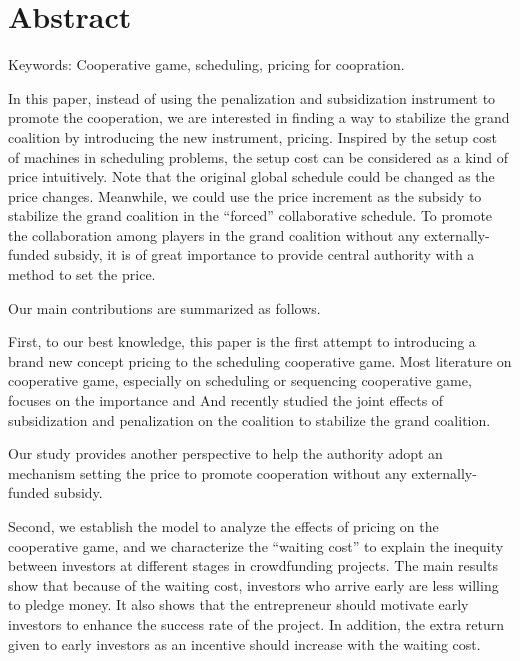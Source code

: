 \section*{Abstract}



Keywords: Cooperative game, scheduling, pricing for coopration.


In this paper, instead of using the penalization and subsidization instrument to promote the cooperation, we are interested in finding a way to stabilize the grand coalition by introducing the new instrument, pricing. Inspired by the setup cost of machines in scheduling problems, the setup cost can be considered as a kind of price intuitively. Note that the original global schedule could be changed as the price changes. Meanwhile, we could use the price increment as the subsidy to stabilize the grand coalition in the “forced” collaborative schedule.
To promote the collaboration among players in the grand coalition without any externally-funded subsidy, it is of great importance to provide central authority with a method to set the price.

Our main contributions are summarized as follows.

First, to our best knowledge, this paper is the first attempt to introducing a brand new concept pricing to the scheduling cooperative game. Most literature on cooperative game, especially on scheduling or sequencing cooperative game, focuses on the importance
and
And recently studied the joint effects of subsidization and penalization on the coalition to stabilize the grand coalition.

Our study provides another perspective to help the authority adopt an mechanism setting the price to promote cooperation without any externally-funded subsidy.

Second, we establish the model to analyze the effects of pricing on the cooperative game, and we characterize the “waiting cost” to explain the inequity between investors at different stages in crowdfunding projects.
The main results show that because of the waiting cost, investors who arrive early are less willing to pledge money. It also shows that the entrepreneur should motivate early investors to enhance the success rate of the project. In addition, the extra return given to early investors as an incentive should increase with the waiting cost.

